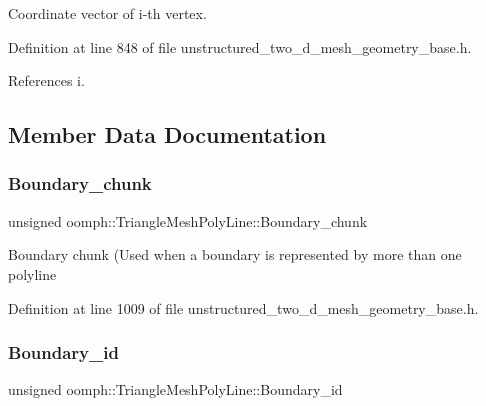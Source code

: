 Coordinate vector of i-\/th vertex. 



Definition at line 848 of file unstructured\+\_\+two\+\_\+d\+\_\+mesh\+\_\+geometry\+\_\+base.\+h.



References i.



\subsection{Member Data Documentation}
\mbox{\label{classoomph_1_1TriangleMeshPolyLine_a4ea4bb4d19d7cecf410772f99275ed98}} 
\subsubsection{\texorpdfstring{Boundary\+\_\+chunk}{Boundary\_chunk}}
{\footnotesize\ttfamily unsigned oomph\+::\+Triangle\+Mesh\+Poly\+Line\+::\+Boundary\+\_\+chunk\hspace{0.3cm}{\ttfamily [private]}}

Boundary chunk (Used when a boundary is represented by more than one polyline 

Definition at line 1009 of file unstructured\+\_\+two\+\_\+d\+\_\+mesh\+\_\+geometry\+\_\+base.\+h.

\mbox{\label{classoomph_1_1TriangleMeshPolyLine_a04b217e740ed45156f1f39cc4c15922e}} 
\subsubsection{\texorpdfstring{Boundary\+\_\+id}{Boundary\_id}}
{\footnotesize\ttfamily unsigned oomph\+::\+Triangle\+Mesh\+Poly\+Line\+::\+Boundary\+\_\+id\hspace{0.3cm}{\ttfamily [private]}}



